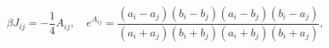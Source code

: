 \begin{equation}
\beta J_{ij}=-\frac{1}{4}A_{ij}, \quad e^{A_{ij}}=\frac{(a_i-a_j)(b_i-b_j)(a_i-b_j)(b_i-a_j)}
{(a_i+a_j)(b_i+b_j)(a_i+b_j)(b_i+a_j)},
\label{BKP}\end{equation}

